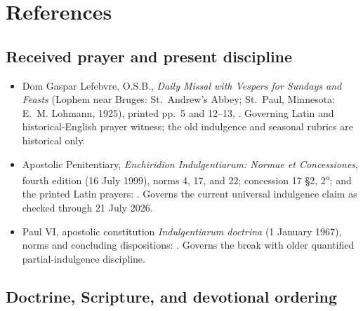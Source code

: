 \section{References}

\subsection{Received prayer and present discipline}

\begin{itemize}
  \item Dom Gaspar Lefebvre, O.S.B., \textit{Daily Missal with Vespers for Sundays and Feasts} (Lophem near Bruges: St.~Andrew's Abbey; St.~Paul, Minnesota: E.~M. Lohmann, 1925), printed pp.~5 and 12--13, . Governing Latin and historical-English prayer witness; the old indulgence and seasonal rubrics are historical only.
  \item Apostolic Penitentiary, \textit{Enchiridion Indulgentiarum: Normae et Concessiones}, fourth edition (16 July 1999), norms 4, 17, and 22; concession 17 \S2, 2\textsuperscript{o}; and the printed Latin prayers: . Governs the current universal indulgence claim as checked through 21 July 2026.
  \item Paul VI, apostolic constitution \textit{Indulgentiarum doctrina} (1 January 1967), norms and concluding dispositions: . Governs the break with older quantified partial-indulgence discipline.
\end{itemize}

\subsection{Doctrine, Scripture, and devotional ordering}

